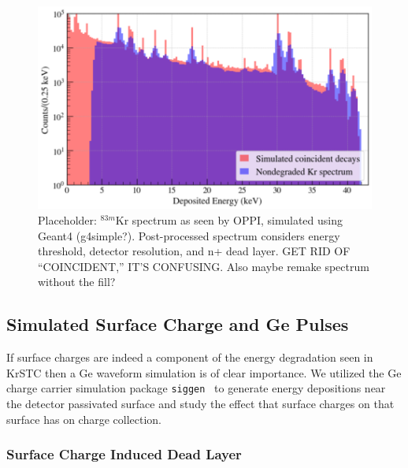 \documentclass[nofootinbib,superscriptaddress, aps, prc, 
10pt, amsmath, amssymb, bibnotes,
altaffilletter, twocolumn, floatfix]{revtex4-2}
\begin{document}
    \begin{figure}
        \includegraphics[width=\columnwidth]{figures/simulated_Kr_spectrum.png}
        \caption{Placeholder: $^{83m}$Kr spectrum as seen by OPPI, simulated using Geant4 (g4simple?). Post-processed spectrum considers energy threshold, detector resolution, and n+ dead layer. GET RID OF ``COINCIDENT,'' IT'S CONFUSING. Also maybe remake spectrum without the fill?}
        \label{fig:sim_spectrum}
    \end{figure}

    \subsection{Simulated Surface Charge and Ge Pulses}
    If surface charges are indeed a component of the energy degradation seen in KrSTC then a Ge waveform simulation is of clear importance. We utilized the Ge charge carrier simulation package \texttt{siggen}~\cite{radford2022siggen} to generate energy depositions near the detector passivated surface and study the effect that surface charges on that surface has on charge collection. 

    \subsubsection{Surface Charge Induced Dead Layer}
\end{document}
